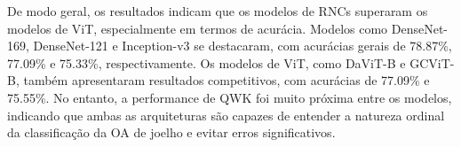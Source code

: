 De modo geral, os resultados indicam que os modelos de RNCs superaram os modelos de ViT, especialmente em termos de acurácia. Modelos como DenseNet-169, DenseNet-121 e Inception-v3 se destacaram, com acurácias gerais de 78.87\%, 77.09\% e 75.33\%, respectivamente. Os modelos de ViT, como DaViT-B e GCViT-B, também apresentaram resultados competitivos, com acurácias de 77.09\% e 75.55\%. No entanto, a performance de QWK foi muito próxima entre os modelos, indicando que ambas as arquiteturas são capazes de entender a natureza ordinal da classificação da OA de joelho e evitar erros significativos.




